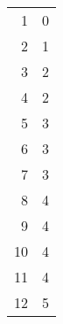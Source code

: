 \documentclass{article}
\begin{document}
\begin{tabular}{|r|r|}
\hline
1& 0\\ 
2& 1\\
3&2\\
4&2\\
5&3\\
6&3\\
7&3\\
8&4\\
9&4\\
10&4\\
11&4\\
12&5\\ \hline

\end{tabular}
\end{document}
